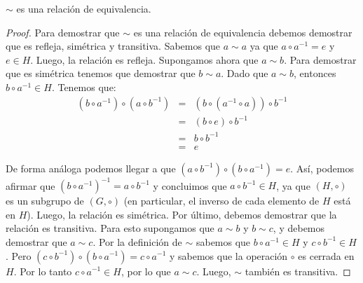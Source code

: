 \begin{lemma}\label{lema:rel bin}
	$\sim$ es una relación de equivalencia.
\end{lemma}
\begin{proof}
Para demostrar que $\sim$ es una relación de equivalencia debemos demostrar que es refleja, simétrica y transitiva.
Sabemos que $a \sim a$ ya que $a \circ a^{-1} = e$ y $e \in H$. Luego, la relación es refleja. 
Supongamos ahora que $a \sim b$. Para demostrar que es simétrica tenemos que demostrar que $b \sim a$.
Dado que $a \sim b$, entonces $b \circ a^{-1} \in H$. Tenemos que:
\begin{eqnarray*}
(b \circ a^{-1}) \circ (a \circ b^{-1}) & = & (b \circ (a^{-1} \circ
a)) \circ b^{-1}\\ 
& = & (b \circ e) \circ b^{-1}\\ 
& = & b \circ b^{-1}\\ 
& = & e
\end{eqnarray*}

De forma análoga podemos llegar a que $(a \circ b^{-1}) \circ (b \circ
a^{-1}) = e$.
Así, podemos afirmar que $(b \circ a^{-1})^{-1} = a \circ b^{-1}$ y concluimos que $a \circ b^{-1}\in H$, ya que $(H, \circ)$ es un subgrupo de $(G, \circ)$ (en particular, el inverso de cada elemento de $H$ está en $H$). Luego, la relación es simétrica.
Por último, debemos demostrar que la relación es transitiva. Para esto supongamos que $a \sim b$ y $b \sim c$, y debemos demostrar que $a \sim c$.
Por la definición de $\sim$ sabemos que $b \circ a^{-1} \in H$ y $c \circ b^{-1} \in H$. %
Pero $(c \circ b^{-1}) \circ (b \circ a^{-1}) = c \circ a^{-1}$ y sabemos que la operación
$\circ$ es cerrada en $H$. Por lo tanto $c \circ a^{-1} \in H$, por lo que
$a\sim c$. Luego, $\sim$ también es transitiva.

\end{proof}

